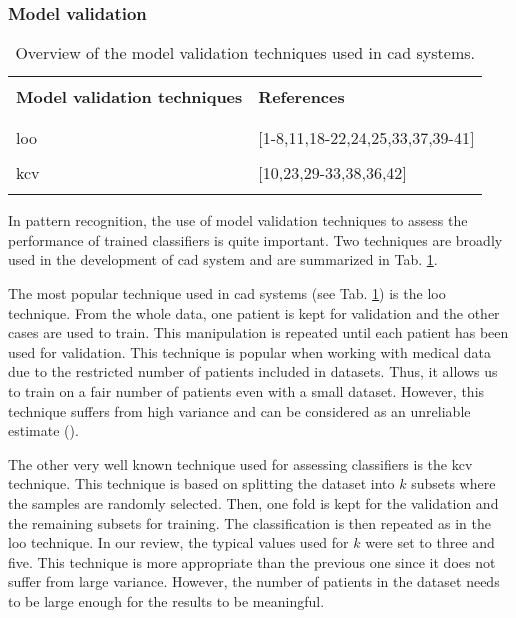 \begin{enumerate}[leftmargin=*]
\end{enumerate}

\subsubsection{Model validation}

\begin{table}
	\caption{Overview of the model validation techniques used in \ac{cad} systems.}
	\small
	\begin{tabular}{p{.55\linewidth} p{.35\linewidth}}
		\hline \\ [-1.5ex]
		\textbf{Model validation techniques} & \textbf{References} \\ \\ [-1.5ex]
		\hline \\ [-1.5ex]
		\quad \acs{loo} & $[$1-8,11,18-22,24,25,33,37,39-41$]$ \\ \\ [-1.5ex]
		\quad \acs{kcv} & $[$10,23,29-33,38,36,42$]$ \\ \\ [-1.5ex]
		\hline
	\end{tabular}
	\label{tab:valmod}
\end{table}

In pattern recognition, the use of model validation techniques to assess the performance of trained classifiers is quite important. Two techniques are broadly used in the development of \ac{cad} system and are summarized in Tab. \ref{tab:valmod}.

The most popular technique used in \ac{cad} systems (see Tab. \ref{tab:valmod}) is the \acf{loo} technique. From the whole data, one patient is kept for validation and the other cases are used to train. This manipulation is repeated until each patient has been used for validation. This technique is popular when working with medical data due to the restricted number of patients included in datasets. Thus, it allows us to train on a fair number of patients even with a small dataset. However, this technique suffers from high variance and can be considered as an unreliable estimate (\cite{Efron1983}).

The other very well known technique used for assessing classifiers is the \acf{kcv} technique. This technique is based on splitting the dataset into $k$ subsets where the samples are randomly selected. Then, one fold is kept for the validation and the remaining subsets for training. The classification is then repeated as in the \ac{loo} technique. In our review, the typical values used for $k$ were set to three and five. This technique is more appropriate than the previous one since it does not suffer from large variance. However, the number of patients in the dataset needs to be large enough for the results to be meaningful.

